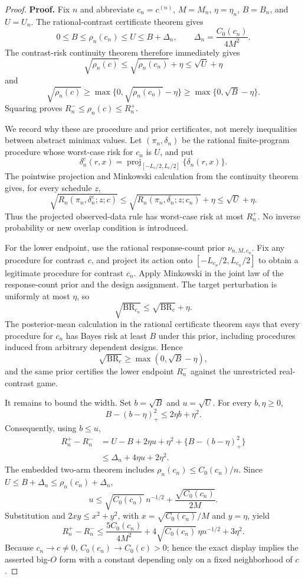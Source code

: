 \documentclass{article}
\begin{document}
\begin{proof}
\textbf{Proof.}
Fix \(n\) and abbreviate \(c_n=c^{(n)}\), \(M=M_n\), \(\eta=\eta_n\), \(B=B_n\), and \(U=U_n\).  The rational-contrast certificate theorem gives
\[
 0\leq B\leq\rho_n(c_n)\leq U
 \leq B+\Delta_n,
 \qquad
 \Delta_n=\frac{C_0(c_n)}{4M^2}.
\]
The contrast-risk continuity theorem therefore immediately gives
\[
 \sqrt{\rho_n(c)}
 \leq\sqrt{\rho_n(c_n)}+\eta
 \leq\sqrt U+\eta
\]
and
\[
 \sqrt{\rho_n(c)}
 \geq\max\{0,\sqrt{\rho_n(c_n)}-\eta\}
 \geq\max\{0,\sqrt B-\eta\}.
\]
Squaring proves \(R_n^-\leq\rho_n(c)\leq R_n^+\).

We record why these are procedure and prior certificates, not merely inequalities between abstract minimax values.  Let \((\pi_n,\delta_n)\) be the rational finite-program procedure whose worst-case risk for \(c_n\) is \(U\), and put
\[
 \delta_n^c(r,x)=\operatorname{proj}_{[-L_c/2,L_c/2]}\{\delta_n(r,x)\}.
\]
The pointwise projection and Minkowski calculation from the continuity theorem gives, for every schedule \(z\),
\[
 \sqrt{R_n(\pi_n,\delta_n^c;z;c)}
 \leq\sqrt{R_n(\pi_n,\delta_n;z;c_n)}+\eta
 \leq\sqrt U+\eta.
\]
Thus the projected observed-data rule has worst-case risk at most \(R_n^+\).  No inverse probability or new overlap condition is introduced.

For the lower endpoint, use the rational response-count prior \(\nu_{n,M,c_n}\).  Fix any procedure for contrast \(c\), and project its action onto \([-L_{c_n}/2,L_{c_n}/2]\) to obtain a legitimate procedure for contrast \(c_n\).  Apply Minkowski in the joint law of the response-count prior and the design assignment.  The target perturbation is uniformly at most \(\eta\), so
\[
 \sqrt{\operatorname{BR}_{c_n}}
 \leq\sqrt{\operatorname{BR}_{c}}+\eta.
\]
The posterior-mean calculation in the rational certificate theorem says that every procedure for \(c_n\) has Bayes risk at least \(B\) under this prior, including procedures induced from arbitrary dependent designs.  Hence
\[
 \sqrt{\operatorname{BR}_{c}}
 \geq\max(0,\sqrt B-\eta),
\]
and the same prior certifies the lower endpoint \(R_n^-\) against the unrestricted real-contrast game.

It remains to bound the width.  Set \(b=\sqrt B\) and \(u=\sqrt U\).  For every \(b,\eta\geq0\),
\[
 B-(b-\eta)_+^2\leq2\eta b+\eta^2.
\]
Consequently, using \(b\leq u\),
\[
 \begin{aligned}
 R_n^+-R_n^-
 &=U-B+2\eta u+\eta^2+\bigl\{B-(b-\eta)_+^2\bigr\}\\
 &\leq\Delta_n+4\eta u+2\eta^2.
 \end{aligned}
\]
The embedded two-arm theorem includes \(\rho_n(c_n)\leq C_0(c_n)/n\).  Since \(U\leq B+\Delta_n\leq\rho_n(c_n)+\Delta_n\),
\[
 u\leq\sqrt{C_0(c_n)}\,n^{-1/2}
 +\frac{\sqrt{C_0(c_n)}}{2M}.
\]
Substitution and \(2xy\leq x^2+y^2\), with \(x=\sqrt{C_0(c_n)}/M\) and \(y=\eta\), yield
\[
 R_n^+-R_n^-
 \leq\frac{5C_0(c_n)}{4M^2}
 +4\sqrt{C_0(c_n)}\,\eta n^{-1/2}
 +3\eta^2.
\]
Because \(c_n\to c\neq0\), \(C_0(c_n)\to C_0(c)>0\); hence the exact display implies the asserted big-\(O\) form with a constant depending only on a fixed neighborhood of \(c\).


\end{proof}
\end{document}
